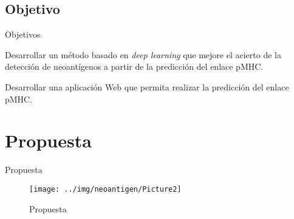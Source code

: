 \documentclass[10pt]{beamer}
\newcommand{\1}{
	\setbeamertemplate{background}{
		\texttt{[image: ../img/1]}
		\tikz[overlay] \fill[fill opacity=0.75,fill=white] (0,0) rectangle (-\paperwidth,\paperheight);
	}
}
\begin{document}
	\subsection{Objetivo}
	
	\begin{frame}{Objetivos}{}	
		\begin{block}{}
			Desarrollar un método basado en \textit{deep learning} que mejore el acierto de la detección de neoantígenos a partir de la predicción del enlace pMHC.
		\end{block}
	
		\begin{block}{}
			Desarrollar una aplicación Web que permita realizar la predicción del enlace pMHC.
		\end{block}	
	\end{frame}
	

	
	\section{Propuesta}
	
	
	

	
	\begin{frame}{Propuesta}{}	
		\begin{figure}
			\centering
			\texttt{[image: ../img/neoantigen/Picture2]}	
			\caption{Propuesta}
		\end{figure}
	\end{frame}
	

	
\end{document}
